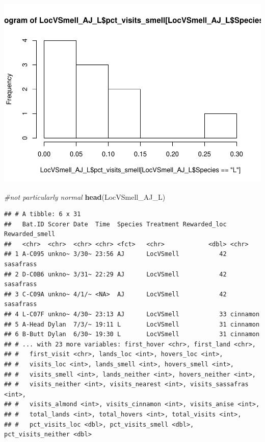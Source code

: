 \documentclass[]{article}
\newenvironment{Shaded}{\begin{snugshade}}{\end{snugshade}}
\newcommand{\KeywordTok}[1]{\textcolor[rgb]{0.13,0.29,0.53}{\textbf{{#1}}}}
\newcommand{\CommentTok}[1]{\textcolor[rgb]{0.56,0.35,0.01}{\textit{{#1}}}}
\newcommand{\NormalTok}[1]{{#1}}
\begin{document}
\includegraphics{Sensory_learning_files/figure-latex/unnamed-chunk-31-1.pdf}

\begin{Shaded}
\begin{Highlighting}[]
\CommentTok{#not particularly normal}
\KeywordTok{head}\NormalTok{(LocVSmell_AJ_L)}
\end{Highlighting}
\end{Shaded}

\begin{verbatim}
## # A tibble: 6 x 31
##   Bat.ID Scorer Date  Time  Species Treatment Rewarded_loc Rewarded_smell
##   <chr>  <chr>  <chr> <chr> <fct>   <chr>            <dbl> <chr>         
## 1 A-C095 unkno~ 3/30~ 23:56 AJ      LocVSmell           42 sasafrass     
## 2 D-C0B6 unkno~ 3/31~ 22:29 AJ      LocVSmell           42 sasafrass     
## 3 C-C09A unkno~ 4/1/~ <NA>  AJ      LocVSmell           42 sasafrass     
## 4 L-C07F unkno~ 4/30~ 23:13 AJ      LocVSmell           33 cinnamon      
## 5 A-Head Dylan  7/3/~ 19:11 L       LocVSmell           31 cinnamon      
## 6 B-Butt Dylan  6/30~ 19:30 L       LocVSmell           31 cinnamon      
## # ... with 23 more variables: first_hover <chr>, first_land <chr>,
## #   first_visit <chr>, lands_loc <int>, hovers_loc <int>,
## #   visits_loc <int>, lands_smell <int>, hovers_smell <int>,
## #   visits_smell <int>, lands_neither <int>, hovers_neither <int>,
## #   visits_neither <int>, visits_nearest <int>, visits_sassafras <int>,
## #   visits_almond <int>, visits_cinnamon <int>, visits_anise <int>,
## #   total_lands <int>, total_hovers <int>, total_visits <int>,
## #   pct_visits_loc <dbl>, pct_visits_smell <dbl>, pct_visits_neither <dbl>
\end{verbatim}
\end{document}
